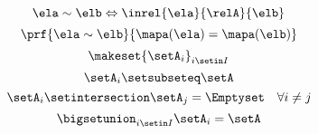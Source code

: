 \begin{forslides}
    \begin{equation}
        \label{eq:slides_session2_rel_158}
        \ela\sim \elb \Leftrightarrow \inrel{\ela}{\relA}{\elb}
    \end{equation}
    \begin{equation}
        \label{eq:slides_session2_rel_159}
        \prf{
            \ela\sim \elb
        }{
            \mapa(\ela)=\mapa(\elb)
        }
    \end{equation}
    \begin{equation}
        \label{eq:slides_session2_rel_160}
        \makeset{\setA_i}_{i\setin I}
    \end{equation}
    \begin{equation}
        \label{eq:slides_session2_rel_161}
        \setA_i\setsubseteq \setA
    \end{equation}
    \begin{equation}
        \label{eq:slides_session2_rel_162}
        \setA_i\setintersection \setA_j=\Emptyset \quad \forall i\neq j
    \end{equation}
    \begin{equation}
        \label{eq:slides_session2_rel_163}
        \bigsetunion_{i\setin I}\setA_i=\setA
    \end{equation}


\end{forslides}
